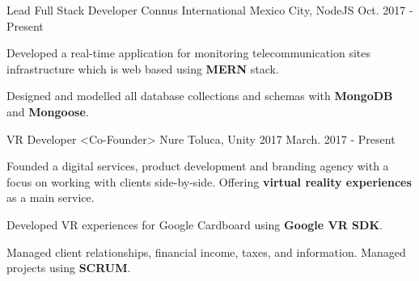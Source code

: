 \begin{cventries}
  \cventry
    {Lead Full Stack Developer}
    {Connus International}
    {Mexico City, NodeJS}
    {Oct. 2017 - Present}
    {
      \begin{cvitems}
        \item {Developed a real-time application for monitoring telecommunication sites infrastructure which is web based using \textbf{MERN} stack.}
        \item {Designed and modelled all database collections and schemas with \textbf{MongoDB} and \textbf{Mongoose}.}
      \end{cvitems}
    }
  \cventry
    {VR Developer <Co-Founder>}
    {Nure}
    {Toluca, Unity 2017}
    {March. 2017 - Present}
    {
      \begin{cvitems}
        \item {Founded a digital services, product development and branding agency with a focus on working with clients side-by-side. Offering \textbf{virtual reality experiences} as a main service. }
        \item {Developed VR experiences for Google Cardboard using \textbf{Google VR SDK}. }
         \item {Managed client relationships, financial income, taxes, and information. Managed projects using \textbf{SCRUM}. }
      \end{cvitems}
    }
\end{cventries}
